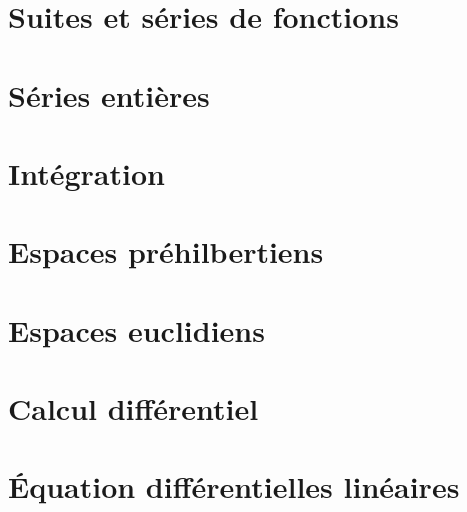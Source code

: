 \documentclass[12pt]{article}
\theoremstyle{remark}
\theoremstyle{remark}
\begin{document}
\section{Suites et séries de fonctions}
\cleardoublepage
\section{Séries entières}
\cleardoublepage
\section{Intégration}
\cleardoublepage
\section{Espaces préhilbertiens}
\cleardoublepage
\section{Espaces euclidiens}
\cleardoublepage
\section{Calcul différentiel}
\cleardoublepage
\section{\'Equation différentielles linéaires}
\end{document}
